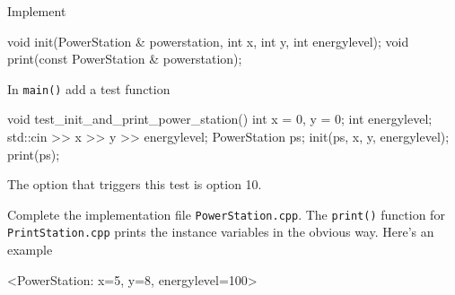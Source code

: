 Implement
\begin{console}
void init(PowerStation & powerstation, int x, int y, int energylevel);
void print(const PowerStation & powerstation);
\end{console}

In \verb!main()! add a test function
\begin{console}
void test_init_and_print_power_station()
{
    int x = 0, y = 0;
    int energylevel;
    std::cin >> x >> y >> energylevel;
    PowerStation ps;
    init(ps, x, y, energylevel);
    print(ps);
}
\end{console}

The option that triggers this test is option 10.

Complete the implementation file \verb!PowerStation.cpp!.
The \verb!print()! function for \verb!PrintStation.cpp! prints the 
instance variables in the obvious way. Here's an example
\begin{console}
<PowerStation: x=5, y=8, energylevel=100>
\end{console}

